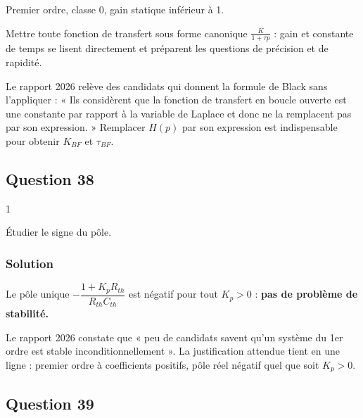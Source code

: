 \documentclass[11pt,a4paper]{article}
\begin{document}
Premier ordre, classe 0, gain statique inférieur à 1.

\begin{methode}

Mettre toute fonction de transfert sous forme canonique \(\frac{K}{1+\tau p}\) : gain et constante de temps se lisent directement et préparent les questions de précision et de rapidité.

\end{methode}

\begin{piege}

Le rapport 2026 relève des candidats qui donnent la formule de Black sans l'appliquer : « Ils considèrent que la fonction de transfert en boucle ouverte est une constante par rapport à la variable de Laplace et donc ne la remplacent pas par son expression. » Remplacer \(H(p)\) par son expression est indispensable pour obtenir \(K_{BF}\) et \(\tau_{BF}\).

\end{piege}

\hypertarget{question-38}{%
\subsection{Question 38}\label{question-38}}

\begin{indication}{1}

Étudier le signe du pôle.

\end{indication}

\hypertarget{solution-37}{%
\subsubsection{Solution}\label{solution-37}}

Le pôle unique \(-\dfrac{1+K_pR_{th}}{R_{th}C_{th}}\) est négatif pour tout \(K_p>0\) : \textbf{pas de problème de stabilité.}

\begin{jury}

Le rapport 2026 constate que « peu de candidats savent qu'un système du 1er ordre est stable inconditionnellement ». La justification attendue tient en une ligne : premier ordre à coefficients positifs, pôle réel négatif quel que soit \(K_p>0\).

\end{jury}

\hypertarget{question-39}{%
\subsection{Question 39}\label{question-39}}
\end{document}
